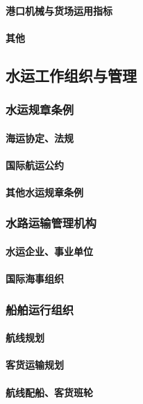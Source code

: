\documentclass[UTF8]{../ApplicationUniverse}
\begin{document}
            \paragraph{港口机械与货场运用指标}
            \paragraph{其他}
    \subsection{水运工作组织与管理}
        \subsubsection{水运规章条例}
            \paragraph{海运协定、法规}
            \paragraph{国际航运公约}
            \paragraph{其他水运规章条例}
        \subsubsection{水路运输管理机构}
            \paragraph{水运企业、事业单位}
            \paragraph{国际海事组织}
        \subsubsection{船舶运行组织}
            \paragraph{航线规划}
            \paragraph{客货运输规划}
            \paragraph{航线配船、客货班轮}
\end{document}
